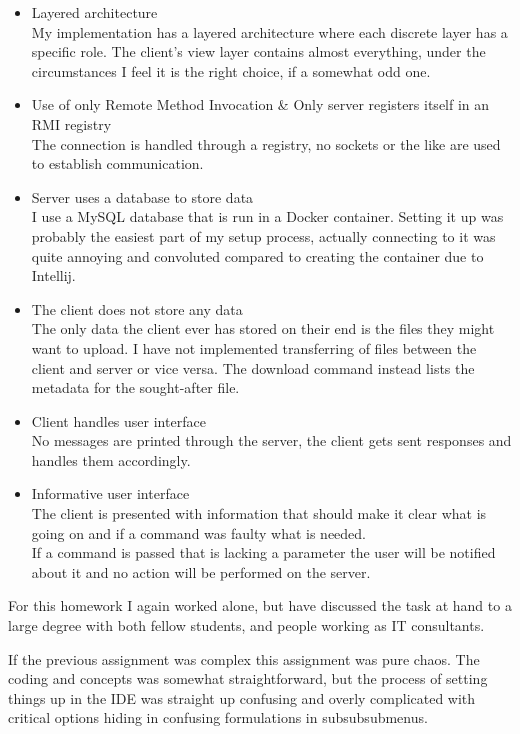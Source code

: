 \documentclass[a4paper]{scrartcl}
\begin{document}
\begin{itemize}
	\item{
		Layered architecture\\
		My implementation has a layered architecture where each discrete layer has a specific role.
		The client's view layer contains almost everything, under the circumstances I feel it is the right choice, if a somewhat odd one.
	}
	\item{
		Use of only Remote Method Invocation \& Only server registers itself in an RMI registry\\
		The connection is handled through a registry, no sockets or the like are used to establish communication.
	}
	\item{
		Server uses a database to store data\\
		I use a MySQL database that is run in a Docker container. Setting it up was probably the easiest part of my setup process, actually connecting to it was quite annoying and convoluted compared to creating the container due to Intellij.
	}
	\item{
		The client does not store any data\\
		The only data the client ever has stored on their end is the files they might want to upload. I have not implemented transferring of files between the client and server or vice versa. The download command instead lists the metadata for the sought-after file.
	}
	\item{
		Client handles user interface\\
		No messages are printed through the server, the client gets sent responses and handles them accordingly.
	}
	\item{
		Informative user interface\\
		The client is presented with information that should make it clear what is going on and if a command was faulty what is needed.\\
		If a command is passed that is lacking a parameter the user will be notified about it and no action will be performed on the server.
	}
\end{itemize}

For this homework I again worked alone, but have discussed the task at hand to a large degree with both fellow students, and people working as IT consultants. 

If the previous assignment was complex this assignment was pure chaos. The coding and concepts was somewhat straightforward, but the process of setting things up in the IDE was straight up confusing and overly complicated with critical options hiding in confusing formulations in subsubsubmenus.
\end{document}
